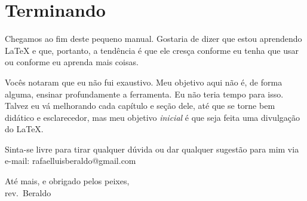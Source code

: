 \chapter{Terminando}

Chegamos ao fim deste pequeno manual. Gostaria de dizer que estou aprendendo \LaTeX{} e que, portanto, a tendência é que ele cresça conforme eu tenha que usar ou conforme eu aprenda mais coisas.

Vocês notaram que eu não fui exaustivo. Meu objetivo aqui não é, de forma alguma, ensinar profundamente a ferramenta. Eu não teria tempo para isso. Talvez eu vá melhorando cada capítulo e seção dele, até que se torne bem didático e esclarecedor, mas meu objetivo \emph{inicial} é que seja feita uma divulgação do \LaTeX.

Sinta-se livre para tirar qualquer dúvida ou dar qualquer sugestão para mim via e-mail: \textsf{rafaelluisberaldo@gmail.com}

\begin{flushright}
Até mais, e obrigado pelos peixes,\\
rev.~Beraldo
\end{flushright}
